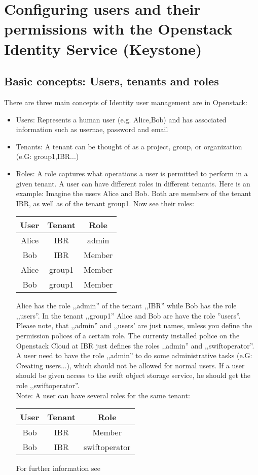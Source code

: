 \documentclass[a4paper,ngerman,bibtotocliststotoc]{scrartcl}
\begin{document}
\section{Configuring users and their permissions with the Openstack
  Identity Service (Keystone)}

\subsection{Basic concepts: Users, tenants and roles}
\label{sec:basic-conc-users}
There are three main concepts of Identity user management are in Openstack:
\begin{itemize}
\item Users: Represents a human user (e.g. Alice,Bob) and has associated
  information such as usernae, password and email
\item Tenants: A tenant can be thought of as a project, group, or
  organization (e.G: group1,IBR...) 
\item Roles: A role captures what operations a user is permitted to
  perform in a given tenant.  A user can have different roles in
  different tenants. Here is an example: Imagine the users Alice and
  Bob. Both are members of the tenant IBR, as well as of the tenant
  group1. Now see their roles:\\
  \begin{center}
  \begin{tabular}{c|c|c}
    User & Tenant & Role  \tabularnewline \hline
    Alice &IBR& admin \tabularnewline \hline
    Bob &IBR&Member  \tabularnewline \hline
    Alice&group1&Member \tabularnewline \hline
    Bob&group1&Member
  \end{tabular}  
  \end{center}
  Alice has the role ,,admin'' of the  tenant ,,IBR'' while
  Bob has the role ,,users''. In the tenant ,,group1'' Alice and Bob
  are have the role ''users''. Please note, that ,,admin'' and
  ,,users' are just names, unless you define the permission polices of a
  certain role. The currenty installed police on the Openstack Cloud
  at IBR just defines the roles ,,admin'' and ,,swiftoperator''.
  A user need to have the role ,,admin'' to do some administrative tasks (e.G: Creating
  users...), which should not be allowed for normal users. If a user
  should be given access to the swift object storage service, he
  should get the role ,,swiftoperator''.\\
Note: A user can have several roles for the same tenant:
\begin{center}
  \begin{tabular}{c|c|c}
    User & Tenant & Role  \tabularnewline \hline
    Bob &IBR&Member \tabularnewline \hline
    Bob & IBR&swiftoperator%
  \end{tabular}  
  \end{center}
 For further information see %
\end{itemize}
\end{document}
